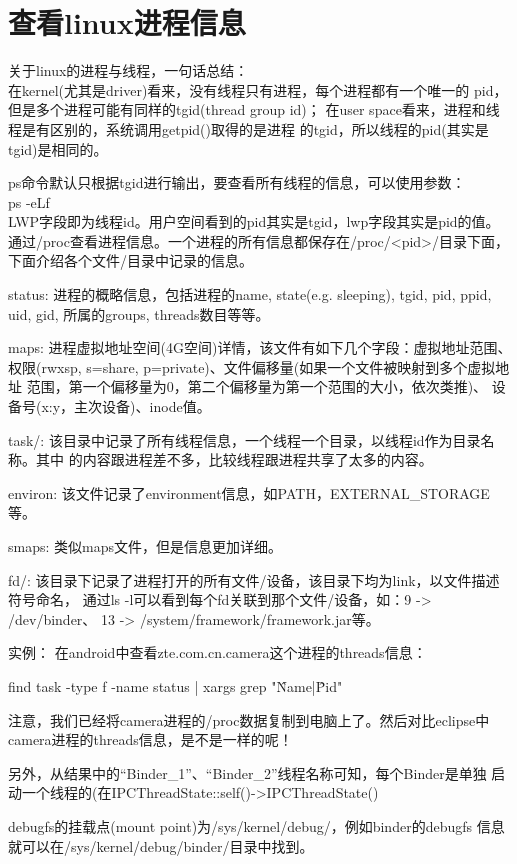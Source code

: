 ﻿\documentclass[a4paper,11pt]{article}
\begin{document}
  \section[查看linux进程信息]{查看linux进程信息}
  关于linux的进程与线程，一句话总结：\\
  在kernel(尤其是driver)看来，没有线程只有进程，每个进程都有一个唯一的
  pid，但是多个进程可能有同样的tgid(thread group id)；
  在user space看来，进程和线程是有区别的，系统调用getpid()取得的是进程
  的tgid，所以线程的pid(其实是tgid)是相同的。

  ps命令默认只根据tgid进行输出，要查看所有线程的信息，可以使用参数：\\
  ps -eLf\\
  LWP字段即为线程id。用户空间看到的pid其实是tgid，lwp字段其实是pid的值。\\[10pt]

  通过/proc查看进程信息。一个进程的所有信息都保存在/proc/<pid>/目录下面，
  下面介绍各个文件/目录中记录的信息。

  status: 进程的概略信息，包括进程的name, state(e.g. sleeping), tgid, pid, ppid,
  uid, gid, 所属的groups, threads数目等等。

  maps: 进程虚拟地址空间(4G空间)详情，该文件有如下几个字段：虚拟地址范围、
  权限(rwxsp, s=share, p=private)、文件偏移量(如果一个文件被映射到多个虚拟地址
  范围，第一个偏移量为0，第二个偏移量为第一个范围的大小，依次类推)、
  设备号(x:y，主次设备)、inode值。

  task/: 该目录中记录了所有线程信息，一个线程一个目录，以线程id作为目录名称。其中
  的内容跟进程差不多，比较线程跟进程共享了太多的内容。

  environ: 该文件记录了environment信息，如PATH，EXTERNAL\_STORAGE等。

  smaps: 类似maps文件，但是信息更加详细。

  fd/: 该目录下记录了进程打开的所有文件/设备，该目录下均为link，以文件描述符号命名，
  通过ls -l可以看到每个fd关联到那个文件/设备，如：9 -> /dev/binder、
  13 -> /system/framework/framework.jar等。
  
  \vspace{5pt}

  实例：
  在android中查看zte.com.cn.camera这个进程的threads信息：

  find task -type f -name status | xargs grep "\^Name\bs|\^Pid"

  注意，我们已经将camera进程的/proc数据复制到电脑上了。然后对比eclipse中
  camera进程的threads信息，是不是一样的呢！

  另外，从结果中的“Binder\_1”、“Binder\_2”线程名称可知，每个Binder是单独
  启动一个线程的(在IPCThreadState::self()->IPCThreadState()

  debugfs的挂载点(mount point)为/sys/kernel/debug/，例如binder的debugfs
  信息就可以在/sys/kernel/debug/binder/目录中找到。

  
\end{document}

